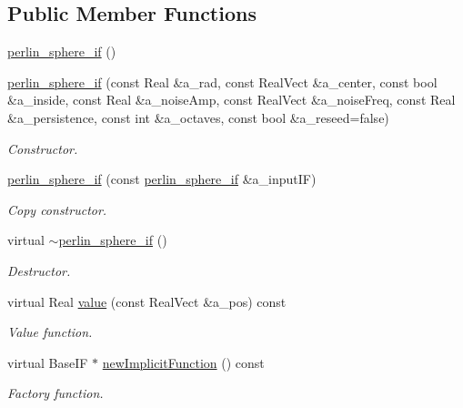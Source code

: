 \subsection*{Public Member Functions}
\begin{DoxyCompactItemize}
\item 
\hyperlink{classperlin__sphere__if_a621084f4451f2b1ce913c30934c47aac}{perlin\+\_\+sphere\+\_\+if} ()
\item 
\hyperlink{classperlin__sphere__if_a8e146896f2468d440f53cdc838368eb1}{perlin\+\_\+sphere\+\_\+if} (const Real \&a\+\_\+rad, const Real\+Vect \&a\+\_\+center, const bool \&a\+\_\+inside, const Real \&a\+\_\+noise\+Amp, const Real\+Vect \&a\+\_\+noise\+Freq, const Real \&a\+\_\+persistence, const int \&a\+\_\+octaves, const bool \&a\+\_\+reseed=false)
\begin{DoxyCompactList}\small\item\em Constructor. \end{DoxyCompactList}\item 
\hyperlink{classperlin__sphere__if_a5ede857f290cff3fe939fb8f3a4df912}{perlin\+\_\+sphere\+\_\+if} (const \hyperlink{classperlin__sphere__if}{perlin\+\_\+sphere\+\_\+if} \&a\+\_\+input\+IF)
\begin{DoxyCompactList}\small\item\em Copy constructor. \end{DoxyCompactList}\item 
virtual \hyperlink{classperlin__sphere__if_a76d08f8f552bde47ac7bdfc0fb4680d5}{$\sim$perlin\+\_\+sphere\+\_\+if} ()
\begin{DoxyCompactList}\small\item\em Destructor. \end{DoxyCompactList}\item 
virtual Real \hyperlink{classperlin__sphere__if_a7e9900b9eb61080db8a884685ef2c9ab}{value} (const Real\+Vect \&a\+\_\+pos) const 
\begin{DoxyCompactList}\small\item\em Value function. \end{DoxyCompactList}\item 
virtual Base\+IF $\ast$ \hyperlink{classperlin__sphere__if_a1feafe792ec06d7d8ee009dbd34ae9bc}{new\+Implicit\+Function} () const 
\begin{DoxyCompactList}\small\item\em Factory function. \end{DoxyCompactList}\end{DoxyCompactItemize}
